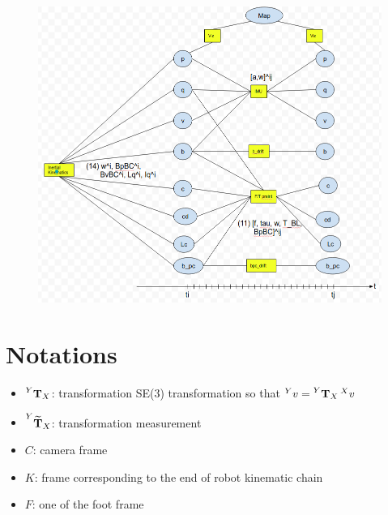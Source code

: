 \documentclass[11pt]{article}
\newcommand{\T}[2]{\prescript{#1}{}{\bfT}_{#2}}
\newcommand{\Tm}[2]{\prescript{#1}{}{\widetilde{\bfT}}_{#2}}
\begin{document}
\begin{figure}[ht]
    \centering
    \includegraphics[width=1\linewidth]{img/HumanoidStateFactorGraph.png}
    \label{fig:my_label}
\end{figure}





\section{Notations}
\begin{itemize}
    \item $\T{Y}{X}$: transformation SE(3) transformation so that $\prescript{Y}{}{v}=\T{Y}{X}\prescript{X}{}{v}$
    \item $\Tm{Y}{X}$: transformation measurement
    \item $C$: camera frame
    \item $K$: frame corresponding to the end of robot kinematic chain 
    \item $F$: one of the foot frame 
\end{itemize}
\end{document}
